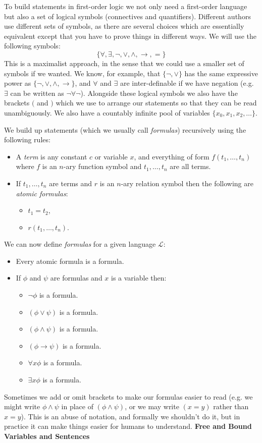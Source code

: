 \documentclass{article}
\theoremstyle{plain}
\theoremstyle{definition}
\newcommand{\ra}{\rightarrow}
\begin{document}
To build statements in first-order logic we not only need a first-order language but also a set of logical symbols (connectives and quantifiers). Different authors use different sets of symbols, as there are several choices which are essentially equivalent except that you have to prove things in different ways. We will use the following symbols:
\[\{\forall,\exists,\neg,\vee,\wedge,\ra,=\}\]
This is a maximalist approach, in the sense that we could use a smaller set of symbols if we wanted. We know, for example, that $\{\neg,\vee\}$ has the same expressive power as $\{\neg,\vee,\wedge,\ra\}$, and $\forall$ and $\exists$ are inter-definable if we have negation (e.g. $\exists$ can be written as $\neg\forall\neg$). Alongside these logical symbols we also have the brackets $($ and $)$ which we use to arrange our statements so that they can be read unambiguously. We also have a countably infinite pool of variables $\{x_0,x_1,x_2,\ldots\}$.

We build up statements (which we usually call \emph{formulas}) recursively using the following rules:
\begin{itemize}
\item A \emph{term} is any constant $c$ or variable $x$, and everything of form $f(t_1,\ldots,t_n)$ where $f$ is an $n$-ary function symbol and $t_1,\ldots,t_n$ are all terms.
\item If $t_1,\ldots,t_n$ are terms and $r$ is an $n$-ary relation symbol then the following are \emph{atomic formulas}:
\begin{itemize}
\item $t_1=t_2$,
\item $r(t_1,\ldots,t_n)$.
\end{itemize}
\end{itemize}
We can now define \emph{formulas} for a given language $\mathscr{L}$:
\begin{itemize}
\item Every atomic formula is a formula.
\item If $\phi$ and $\psi$ are formulas and $x$ is a variable then:
\begin{itemize}
\item $\neg \phi$ is a formula.
\item $(\phi\vee \psi)$ is a formula.
\item $(\phi\wedge \psi)$ is a formula.
\item $(\phi\ra \psi)$ is a formula.
\item $\forall x\phi$ is a formula.
\item $\exists x\phi$ is a formula.
\end{itemize}
\end{itemize}
Sometimes we add or omit brackets to make our formulas easier to read (e.g. we might write $\phi\wedge \psi$ in place of $(\phi\wedge \psi)$, or we may write $(x=y)$ rather than $x=y$). This is an abuse of notation, and formally we shouldn't do it, but in practice it can make things easier for humans to understand.
\newline\newline 
\noindent
\textbf{Free and Bound Variables and Sentences}
\end{document}
